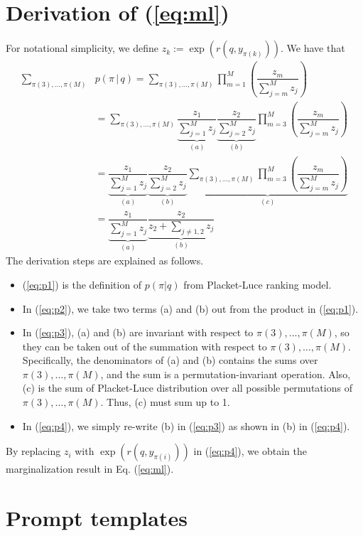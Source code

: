 \section{Derivation of (\ref{eq:ml})}\label{appendix:proof}
For notational simplicity, we define \(
z_k := \exp({r(q,y_{\pi(k)})})\). We have that
\begin{align}
   \sum_{\pi(3),\ldots,\pi(M)}&p(\pi \, |\, q) = \sum_{\pi(3),\ldots,\pi(M)}\prod_{m=1}^M \left(\dfrac{z_m}{\sum_{j=m}^M z_j}\right)\label{eq:p1}
   \\&=\sum_{\pi(3),\ldots,\pi(M)}\underbrace{\dfrac{z_1}{\sum_{j=1}^M z_j}}_{(a)}\underbrace{\dfrac{z_2}{\sum_{j=2}^M z_j}}_{(b)} \prod_{m=3}^M \left(\dfrac{z_m}{\sum_{j=m}^M z_j}\right)\label{eq:p2}
   \\&=\underbrace{\dfrac{z_1}{\sum_{j=1}^M z_j}}_{(a)}\underbrace{\dfrac{z_2}{\sum_{j=2}^M z_j}}_{(b)} \underbrace{\sum_{\pi(3),\ldots,\pi(M)}\prod_{m=3}^M \left(\dfrac{z_m}{\sum_{j=m}^M z_j}\right)}_{(c)} \label{eq:p3}
   \\&=\underbrace{\dfrac{z_1}{\sum_{j=1}^M z_j}}_{(a)}\underbrace{\dfrac{z_2}{z_2 + \sum_{j\neq 1,2} z_j}}_{(b)} \label{eq:p4}
\end{align}
The derivation steps are explained as follows. \begin{itemize}
    \item 
(\ref{eq:p1}) is the definition of $p(\pi|q)$ from Placket-Luce ranking model. \item In (\ref{eq:p2}), we take two terms (a) and (b) out from the product in  (\ref{eq:p1}). \item In (\ref{eq:p3}), (a) and (b) are invariant with respect to $\pi(3),\ldots,\pi(M)$, so they can be taken out of the summation with respect to $\pi(3),\ldots,\pi(M)$. Specifically, the denominators of (a) and (b) contains the sums over $\pi(3),\ldots,\pi(M)$, and the sum is a permutation-invariant operation. Also, (c) is the sum of Placket-Luce distribution over all possible permutations of $\pi(3),\ldots,\pi(M)$. Thus, (c) must sum up to 1. \item In (\ref{eq:p4}), we simply re-write (b) in (\ref{eq:p3}) as shown in (b) in (\ref{eq:p4}). 
\end{itemize}
By replacing $z_i$ with $\exp(r(q,y_{\pi(i)}))$ in (\ref{eq:p4}), we obtain the marginalization result in Eq. (\ref{eq:ml}).


\newpage

\section{Prompt templates}\label{appendix:prompts}

